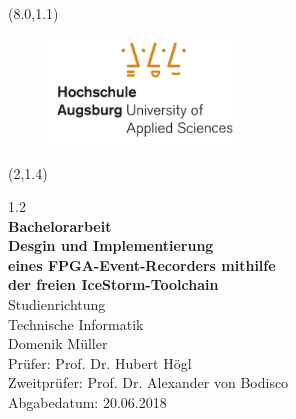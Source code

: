 
\textblockorigin{20mm}{30mm}

\thispagestyle{empty}\null
\begin{textblock}{10}(8.0,1.1)
\begin{figure}[h]
	\centering
		\includegraphics[width=0.45\textwidth]{logos/hsa_informatik_logo_lq.pdf}
\end{figure}

\end{textblock}


\begin{textblock}{15}(2,1.4)
	\begin{flushleft}
		\begin{spacing} {1.2}
			\LARGE	
				\vspace{140pt}
				\textcolor[rgb]{1,0.41,0.13}{\\
				\textbf{Bachelorarbeit}}\\
				\vspace{10pt}
			\LARGE   \textbf{Desgin und Implementierung \\eines FPGA-Event-Recorders mithilfe \\der freien IceStorm-Toolchain} \\			
			\Large
				\vspace{30pt}		
				Studienrichtung\\
				Technische Informatik\\
				\vspace{30pt}
				Domenik Müller\\
				\vspace{30pt}		
				\vspace{80pt}		
			\Large
				Prüfer: Prof. Dr. Hubert Högl\\
				Zweitprüfer: Prof. Dr. Alexander von Bodisco\\ 
				\vspace{7pt}		
				Abgabedatum: 20.06.2018\\
			\end{spacing}
		\end{flushleft}
		
\end{textblock}



